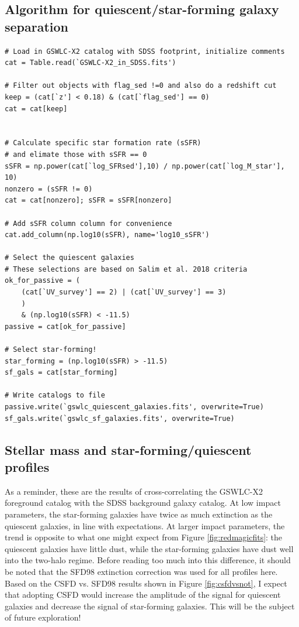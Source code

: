\documentclass[11pt, oneside]{article}   	%
\begin{document}
\subsection{Algorithm for quiescent/star-forming galaxy separation}

\small 
\begin{verbatim}
# Load in GSWLC-X2 catalog with SDSS footprint, initialize comments
cat = Table.read(`GSWLC-X2_in_SDSS.fits')

# Filter out objects with flag_sed !=0 and also do a redshift cut
keep = (cat[`z'] < 0.18) & (cat[`flag_sed'] == 0)
cat = cat[keep]


# Calculate specific star formation rate (sSFR) 
# and elimate those with sSFR == 0
sSFR = np.power(cat[`log_SFRsed'],10) / np.power(cat[`log_M_star'], 10)
nonzero = (sSFR != 0)
cat = cat[nonzero]; sSFR = sSFR[nonzero]

# Add sSFR column column for convenience
cat.add_column(np.log10(sSFR), name='log10_sSFR')

# Select the quiescent galaxies
# These selections are based on Salim et al. 2018 criteria
ok_for_passive = (
    (cat[`UV_survey'] == 2) | (cat[`UV_survey'] == 3)
    ) 
    & (np.log10(sSFR) < -11.5)
passive = cat[ok_for_passive]

# Select star-forming!
star_forming = (np.log10(sSFR) > -11.5)
sf_gals = cat[star_forming]

# Write catalogs to file
passive.write(`gswlc_quiescent_galaxies.fits', overwrite=True)
sf_gals.write(`gswlc_sf_galaxies.fits', overwrite=True)
\end{verbatim}
\normalsize


\subsection{Stellar mass and star-forming/quiescent profiles}

As a reminder, these are the results of cross-correlating the GSWLC-X2 foreground catalog with the SDSS background galaxy catalog. At low impact parameters, the star-forming galaxies have twice as much extinction as the quiescent galaxies, in line with expectations. At larger impact parameters, the trend is opposite to what one might expect from Figure \ref{fig:redmagicfits}: the quiescent galaxies have little dust, while the star-forming galaxies have dust well into the two-halo regime. Before reading too much into this difference, it should be noted that the SFD98 extinction correction was used for all profiles here. Based on the CSFD vs. SFD98 results shown in Figure \ref{fig:csfdvsnot}, I expect that adopting CSFD would increase the amplitude of the signal for quiescent galaxies and decrease the signal of star-forming galaxies. This will be the subject of future exploration! 
\end{document}
